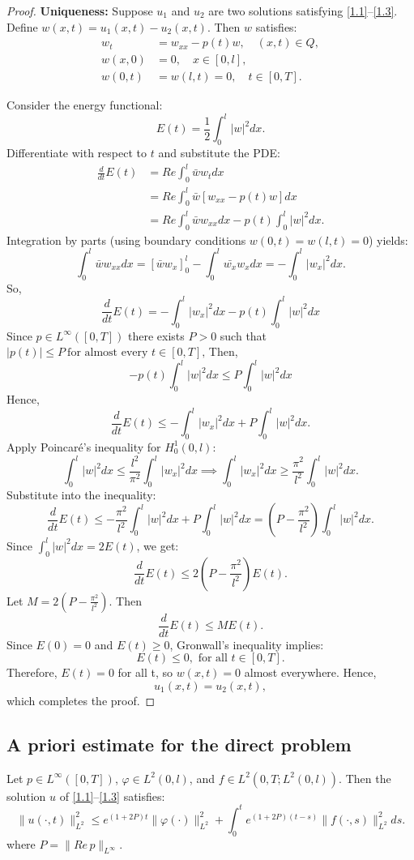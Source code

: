 \documentclass[reqno]{amsart}
\begin{document}
\begin{proof}
\textbf{Uniqueness:} 
Suppose $u_1$ and $u_2$ are two solutions satisfying \eqref{1.1}--\eqref{1.3}. Define $w(x,t) = u_1(x,t) - u_2(x,t)$. Then $w$ satisfies:
\begin{align*}
    w_t &= w_{xx} - p(t) w, \quad (x,t) \in Q, \\
    w(x,0) &= 0, \quad x \in [0,l], \\
    w(0,t) &= w(l,t) = 0, \quad t \in [0,T].
\end{align*}

Consider the energy functional:
\[
E(t) = \frac{1}{2} \int_0^l |w|^2  dx.
\]
Differentiate with respect to $t$ and substitute the PDE:
\begin{align*}
\frac{d}{dt}E(t) &= Re\int_0^l \bar{w}w_t dx \\
&= Re\int_0^l \bar{w} [w_{xx} - p(t) w]  dx \\
&= Re\int_0^l \bar{w} w_{xx}  dx - p(t) \int_0^l |w|^2  dx.
\end{align*}
Integration by parts (using boundary conditions $w(0,t) = w(l,t) = 0$) yields:
\[
\int_0^l \bar{w} w_{xx}  dx = \left[ \bar{w} w_x \right]_0^l - \int_0^l \bar{w_x} w_x   dx = - \int_0^l |w_x|^2 dx.
\]
So,
\[
\frac{d}{dt}E(t) = - \int_0^l |w_x|^2 dx - p(t) \int_0^l |w|^2 dx
\]
Since $p \in L^{\infty}([0,T])$ there exists $P>0$ such that $|p(t)| \leq P\ \text{for almost every  $t \in [0,T]$,}$ Then,
\[
- p(t) \int_0^l |w|^2 dx \leq P \int_0^l |w|^2 dx
\]
Hence,
\[
\frac{d}{dt}E(t) \leq - \int_0^l |w_x|^2 dx + P \int_0^l |w|^2 dx.
\]
Apply Poincaré's inequality for $H_0^1(0,l)$:
\[
\int_0^l |w|^2 dx  \leq \frac{l^2}{\pi^2} \int_0^l | w_x |^2 dx \implies \int_0^l | w_x |^2 dx \geq \frac{\pi^2}{l^2} \int_0^l|w|^2 dx.
\]
Substitute into the inequality:
\[
\frac{d}{dt}E(t) \leq - \frac{\pi^2}{l^2}\int_0^l |w|^2 dx + P \int_0^l |w|^2 dx = (P-\frac{\pi^2}{l^2})\int_0^l |w|^2 dx.
\]
Since $\int_0^l |w|^2 dx = 2E(t)$, we get:
\[
\frac{d}{dt}E(t) \leq 2(P-\frac{\pi^2}{l^2})E(t).
\]
Let $M=2(P-\frac{\pi^2}{l^2})$. Then
\[
\frac{d}{dt}E(t) \leq ME(t).
\]
Since $ E(0) = 0$ and $E(t) \geq 0$, Gronwall’s inequality implies:
\[
E(t) \leq 0, \text{ for all }  t \in [0,T].
\]
Therefore, $E(t)=0$ for all t, so $w(x,t)=0$ almost everywhere. Hence, 
\[
u_1(x,t) = u_2(x,t),
\]
which completes the proof.
\end{proof}

\subsection{A priori estimate for the direct problem}
\begin{theorem}\label{thm:apriori}
Let $p \in L^{\infty}([0,T])$, $\varphi \in L^2(0,l)$, 
and $f \in L^2(0,T;L^2(0,l))$.  Then the solution \(u\) of \eqref{1.1}--\eqref{1.3} satisfies:
\begin{equation}\label{eq:apri}
  \| u(\cdot,t) \|_{L^2}^2 \leq e^{(1+2P)t}\|\varphi(\cdot)\|_{L^2}^2 + \int_0^t e^{(1+2P)(t-s)}\| f(\cdot,s) \|_{L^2}^2 ds.
\end{equation}
where $P=\|Re\,p\|_{L^{\infty}}$.
\end{theorem}
\end{document}
